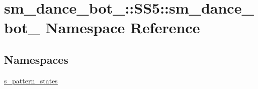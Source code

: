 \hypertarget{namespacesm__dance__bot__3_1_1SS5_1_1sm__dance__bot__3}{}\section{sm\+\_\+dance\+\_\+bot\+\_\+:\+:S\+S5\+:\+:sm\+\_\+dance\+\_\+bot\+\_ Namespace Reference}
\label{namespacesm__dance__bot__3_1_1SS5_1_1sm__dance__bot__3}
\subsection*{Namespaces}
\begin{DoxyCompactItemize}
\item 
 \hyperlink{namespacesm__dance__bot__3_1_1SS5_1_1sm__dance__bot__3_1_1s__pattern__states}{s\+\_\+pattern\+\_\+states}
\end{DoxyCompactItemize}
